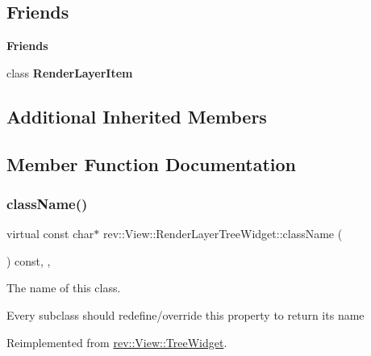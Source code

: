 \subsection*{Friends}
\begin{Indent}\textbf{ Friends}\par
\begin{DoxyCompactItemize}
\item 
\mbox{\label{classrev_1_1_view_1_1_render_layer_tree_widget_ac878145309b89417c4fe495d53ac9b70}} 
class {\bfseries Render\+Layer\+Item}
\end{DoxyCompactItemize}
\end{Indent}
\subsection*{Additional Inherited Members}


\subsection{Member Function Documentation}
\mbox{\label{classrev_1_1_view_1_1_render_layer_tree_widget_afa490edab7f0472cae72674be7b1462f}} 
\subsubsection{\texorpdfstring{className()}{className()}}
{\footnotesize\ttfamily virtual const char$\ast$ rev\+::\+View\+::\+Render\+Layer\+Tree\+Widget\+::class\+Name (\begin{DoxyParamCaption}{ }\end{DoxyParamCaption}) const\hspace{0.3cm}{\ttfamily [inline]}, {\ttfamily [override]}, {\ttfamily [virtual]}}



The name of this class. 

Every subclass should redefine/override this property to return its name 

Reimplemented from \mbox{\hyperlink{classrev_1_1_view_1_1_tree_widget_aedde04f44badced7c60f0e1570e3d0b2}{rev\+::\+View\+::\+Tree\+Widget}}.

